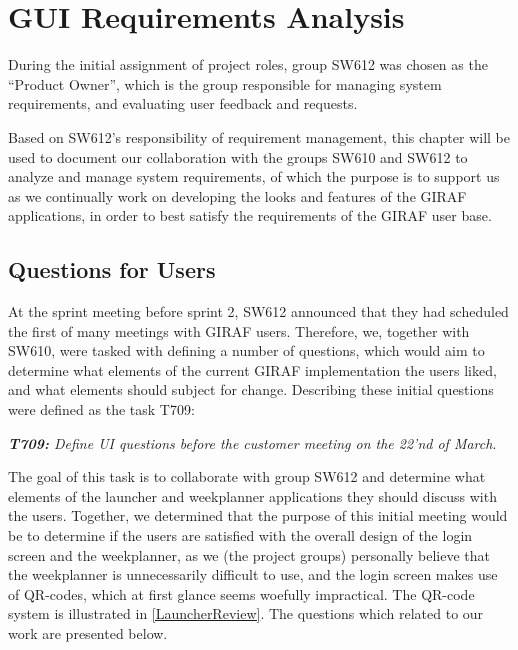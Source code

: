 \chapter{GUI Requirements Analysis}\label{sec:Colab2}
During the initial assignment of project roles, group SW612 was chosen as the
``Product Owner'', which is the group responsible for managing system
requirements, and evaluating user feedback and requests.\nl

Based on SW612's responsibility of requirement management, this chapter will be
used to document our collaboration with the groups SW610 and SW612 to analyze
and manage system requirements, of which the purpose is to support us as we
continually work on developing the looks and features of the GIRAF applications,
in order to best satisfy the requirements of the GIRAF user base.\nl

\section{Questions for Users}
At the sprint meeting before sprint 2, SW612 announced that they had scheduled
the first of many meetings with GIRAF users. Therefore, we, together with SW610,
were tasked with defining a number of questions, which would aim to determine
what elements of the current GIRAF implementation the users liked, and what
elements should subject for change. Describing these initial questions were 
defined as the task T709:\nl

\textit{\textbf{T709:} Define UI questions before the customer meeting on the
22'nd of March}.\nl 

The goal of this task is to collaborate with group SW612 and determine what
elements of the launcher and weekplanner applications they should discuss with
the users. Together, we determined that the purpose of this initial meeting
would be to determine if the users are satisfied with the overall design of the
login screen and the weekplanner, as we (the project groups) personally believe
that the weekplanner is unnecessarily difficult to use, and the login screen
makes use of QR-codes, which at first glance seems woefully impractical. The
QR-code system is illustrated in \autoref{LauncherReview}. The questions which
related to our work are presented below.

